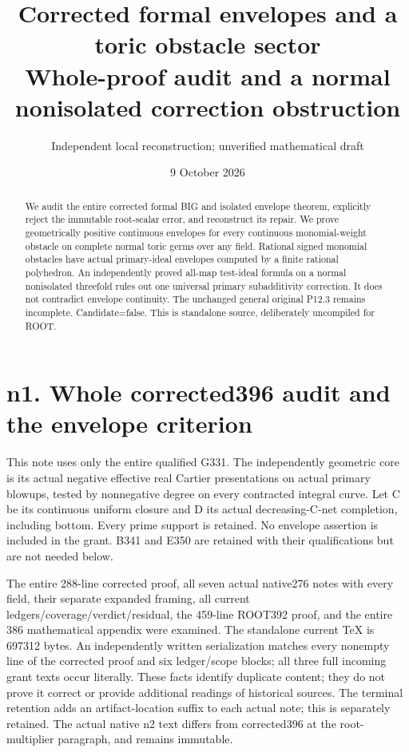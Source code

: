 \documentclass[11pt]{article}
\title{Corrected formal envelopes and a toric obstacle sector\\
Whole-proof audit and a normal nonisolated correction obstruction}
\author{Independent local reconstruction; unverified mathematical draft}
\date{9 October 2026}
\begin{document}
\maketitle
\begin{abstract}
We audit the entire corrected formal BIG and isolated envelope theorem,
explicitly reject the immutable root-scalar error, and reconstruct its repair.
We prove geometrically positive continuous envelopes for every continuous
monomial-weight obstacle on complete normal toric germs over any field.
Rational signed monomial obstacles have actual primary-ideal envelopes
computed by a finite rational polyhedron. An independently proved all-map
test-ideal formula on a normal nonisolated threefold rules out one universal
primary subadditivity correction. It does not contradict envelope continuity.
The unchanged general original P12.3 remains incomplete. Candidate=false.
This is standalone source, deliberately uncompiled for ROOT.
\end{abstract}
\tableofcontents
\newpage
\section{n1. Whole corrected396 audit and the envelope criterion}

This note uses only the entire qualified G331. The independently geometric core is its actual negative effective real Cartier presentations on actual primary blowups, tested by nonnegative degree on every contracted integral curve. Let C be its continuous uniform closure and D its actual decreasing-C-net completion, including bottom. Every prime support is retained. No envelope assertion is included in the grant. B341 and E350 are retained with their qualifications but are not needed below.

The entire 288-line corrected proof, all seven actual native276 notes with every field, their separate expanded framing, all current ledgers/coverage/verdict/residual, the 459-line ROOT392 proof, and the entire 386 mathematical appendix were examined. The standalone current TeX is 697312 bytes. An independently written serialization matches every nonempty line of the corrected proof and six ledger/scope blocks; all three full incoming grant texts occur literally. These facts identify duplicate content; they do not prove it correct or provide additional readings of historical sources. The terminal retention adds an artifact-location suffix to each actual note; this is separately retained. The actual native n2 text differs from corrected396 at the root-multiplier paragraph, and remains immutable.
\end{document}
